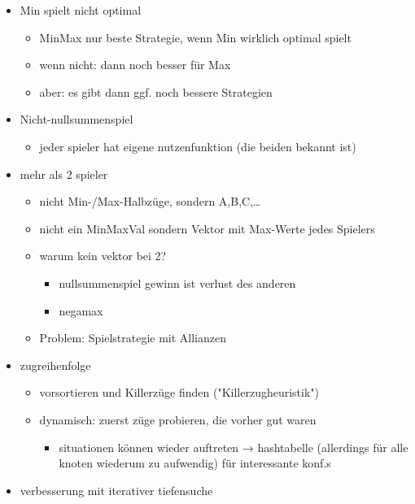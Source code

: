 \documentclass[]{article}
\begin{document}
\begin{itemize}
\item
  Min spielt nicht optimal

  \begin{itemize}
  \item
    MinMax nur beste Strategie, wenn Min wirklich optimal spielt
  \item
    wenn nicht: dann noch besser für Max
  \item
    aber: es gibt dann ggf. noch bessere Strategien
  \end{itemize}
\item
  Nicht-nullsummenspiel

  \begin{itemize}
  \item
    jeder spieler hat eigene nutzenfunktion (die beiden bekannt ist)
  \end{itemize}
\item
  mehr als 2 spieler

  \begin{itemize}
  \item
    nicht Min-/Max-Halbzüge, sondern A,B,C,\ldots{}
  \item
    nicht ein MinMaxVal sondern Vektor mit Max-Werte jedes Spielers
  \item
    warum kein vektor bei 2?

    \begin{itemize}
    \item
      nullsummenspiel gewinn ist verlust des anderen
    \item
      negamax
    \end{itemize}
  \item
    Problem: Spielstrategie mit Allianzen
  \end{itemize}
\item
  zugreihenfolge

  \begin{itemize}
  \item
    vorsortieren und Killerzüge finden ("Killerzugheuristik")
  \item
    dynamisch: zuerst züge probieren, die vorher gut waren

    \begin{itemize}
    \item
      situationen können wieder auftreten → hashtabelle (allerdings für
      alle knoten wiederum zu aufwendig) für interessante konf.s
    \end{itemize}
  \end{itemize}
\item
  verbesserung mit iterativer tiefensuche


\end{itemize}
\end{document}
